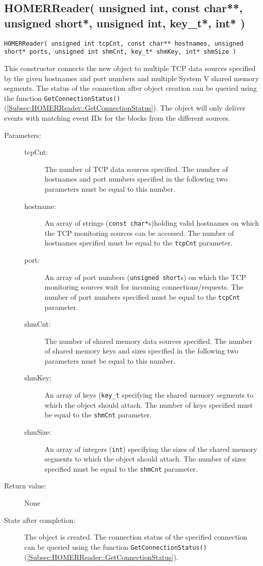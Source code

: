 \documentclass[a4paper,twoside]{article}
\begin{document}
\subsection{HOMERReader( unsigned int, const char**, unsigned short*, unsigned int, key\_t*, int* )}

\texttt{HOMERReader( unsigned int tcpCnt, const char** hostnames, unsigned short* ports, unsigned int shmCnt, key\_t* shmKey, int* shmSize )}

This constructor connects the new object to multiple TCP data sources specified by the given hostnames and port numbers and 
multiple System V shared memory segments. The status of the connection after object creation can be queried
using the function \texttt{GetConnectionStatus()} (\ref{Subsec:HOMERReader::GetConnectionStatus}). The object will only deliver events with matching event IDs for the blocks from the 
different sources. 

\begin{description}
\item[Parameters:]
	\begin{description}
	\item[tcpCnt:] The number of TCP data sources specified. The number of hostnames and port numbers specified in the following
	two parameters must be equal to this number.
	\item[hostname:] An array of strings (\texttt{const char*}s)holding valid hostnames on which the TCP monitoring sources can be accessed. The number of hostnames
	specified must be equal to the \texttt{tcpCnt} parameter. 
	\item[port:] An array of port numbers (\texttt{unsigned short}s) on which the TCP monitoring sources wait for incoming connections/requests. The number of port numbers
	specified must be equal to the \texttt{tcpCnt} parameter. 
	\item[shmCnt:] The number of shared memory data sources specified. The number of shared memory keys and sizes specified in the following
	two parameters must be equal to this number.
	\item[shmKey:] An array of keys (\texttt{key\_t} specifying the shared memory segments to which the object should attach. The number of keys
	specified must be equal to the \texttt{shmCnt} parameter. 
	\item[shmSize:] An array of integers (\texttt{int}) specifying the sizes of the shared memory segments to which the object should attach. 
	The number of sizes specified must be equal to the \texttt{shmCnt} parameter. 
	\end{description}
\item[Return value:] None
\item[State after completion:] The object is created. The connection status of the specified connection can be queried
using the function \texttt{GetConnectionStatus()} (\ref{Subsec:HOMERReader::GetConnectionStatus}). 
\end{description}
\end{document}
